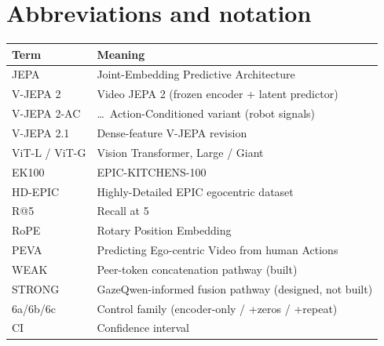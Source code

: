 \section{Abbreviations and notation}

\begin{table}[h]
  \centering
  \begin{tabular}{ll}
    \toprule
    Term & Meaning \\
    \midrule
    JEPA        & Joint-Embedding Predictive Architecture \\
    V-JEPA 2    & Video JEPA 2 (frozen encoder + latent predictor) \\
    V-JEPA 2-AC & \dots\ Action-Conditioned variant (robot signals) \\
    V-JEPA 2.1  & Dense-feature V-JEPA revision \\
    ViT-L / ViT-G & Vision Transformer, Large / Giant \\
    EK100       & EPIC-KITCHENS-100 \\
    HD-EPIC     & Highly-Detailed EPIC egocentric dataset \\
    R@5         & Recall at 5 \\
    RoPE        & Rotary Position Embedding \\
    PEVA        & Predicting Ego-centric Video from human Actions \citep{bai2025peva} \\
    WEAK        & Peer-token concatenation pathway (built) \\
    STRONG      & GazeQwen-informed fusion pathway (designed, not built) \\
    6a/6b/6c    & Control family (encoder-only / +zeros / +repeat) \\
    CI          & Confidence interval \\
    \bottomrule
  \end{tabular}
\end{table}
